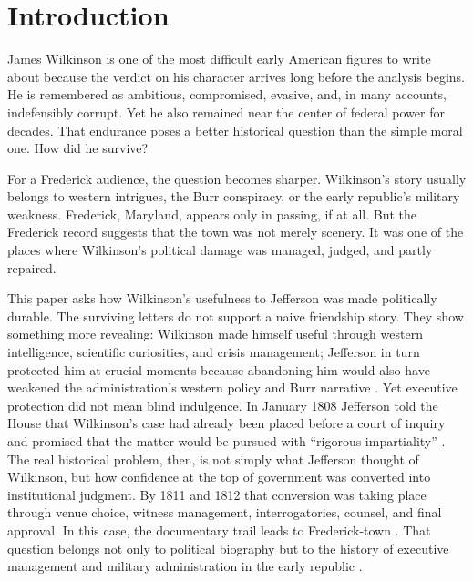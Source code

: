 \section{Introduction}

James Wilkinson is one of the most difficult early American figures to write about because the verdict on his character arrives long before the analysis begins. He is remembered as ambitious, compromised, evasive, and, in many accounts, indefensibly corrupt. Yet he also remained near the center of federal power for decades. That endurance poses a better historical question than the simple moral one. How did he survive?

For a Frederick audience, the question becomes sharper. Wilkinson's story usually belongs to western intrigues, the Burr conspiracy, or the early republic's military weakness. Frederick, Maryland, appears only in passing, if at all. But the Frederick record suggests that the town was not merely scenery. It was one of the places where Wilkinson's political damage was managed, judged, and partly repaired.

This paper asks how Wilkinson's usefulness to Jefferson was made politically durable. The surviving letters do not support a naive friendship story. They show something more revealing: Wilkinson made himself useful through western intelligence, scientific curiosities, and crisis management; Jefferson in turn protected him at crucial moments because abandoning him would also have weakened the administration's western policy and Burr narrative \citep{jefferson1807,wilkinson1807a,onuf2000,lewis2017}. Yet executive protection did not mean blind indulgence. In January 1808 Jefferson told the House that Wilkinson's case had already been placed before a court of inquiry and promised that the matter would be pursued with ``rigorous impartiality'' \citep{jefferson1808message}. The real historical problem, then, is not simply what Jefferson thought of Wilkinson, but how confidence at the top of government was converted into institutional judgment. By 1811 and 1812 that conversion was taking place through venue choice, witness management, interrogatories, counsel, and final approval. In this case, the documentary trail leads to Frederick-town \citep{wilkinson1811madison,madison1812}. That question belongs not only to political biography but to the history of executive management and military administration in the early republic \citep{kohn1975,stagg1983,watson2012}.

